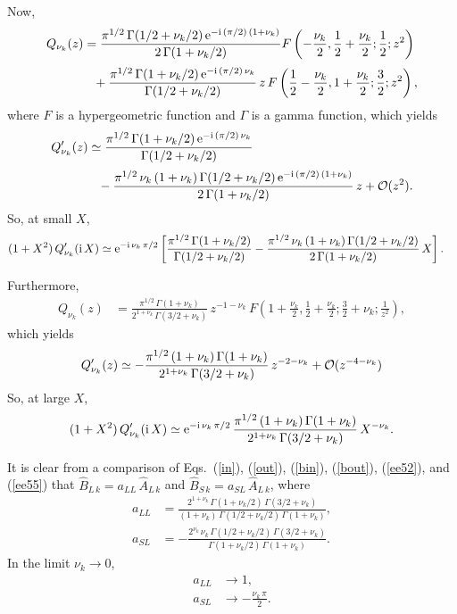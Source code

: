 \documentclass[12pt,prb,aps]{revtex4-1}
\begin{document}
Now,\cite{eda}
\begin{align}
Q_{\nu_k}(z)&= \frac{\pi^{1/2}\,\Gamma(1/2+\nu_k/2)\,{\rm e}^{-{\rm i}\,(\pi/2)\,(1+\nu_k)}}{2\,\Gamma(1+\nu_k/2)}F\left(-\frac{\nu_k}{2},\frac{1}{2}+\frac{\nu_k}{2};\frac{1}{2};z^2\right)\nonumber\\[0.5ex]
&\phantom{=}+\frac{\pi^{1/2}\,\Gamma(1+\nu_k/2)\,{\rm e}^{-{\rm i}\,(\pi/2)\,\nu_k}}{\Gamma(1/2+\nu_k/2)}\,z\,F\left(\frac{1}{2}-\frac{\nu_k}{2},1+\frac{\nu_k}{2};\frac{3}{2};z^2\right),
\end{align}
where $F$ is a hypergeometric function and $\Gamma$ is a gamma function,\cite{abramb,abramd}
which yields
\begin{align}
Q_{\nu_k}'(z)&\simeq\frac{\pi^{1/2}\,\Gamma(1+\nu_k/2)\,{\rm e}^{-{\rm i}\,(\pi/2)\,\nu_k}}{\Gamma(1/2+\nu_k/2)}\nonumber\\[0.5ex]
&\phantom{=}- \frac{\pi^{1/2}\,\nu_k\,(1+\nu_k)\,\Gamma(1/2+\nu_k/2)\,{\rm e}^{-{\rm i}\,(\pi/2)\,(1+\nu_k)}}{2\,\Gamma(1+\nu_k/2)}\,z +{\cal O}(z^2).
\end{align}
So, at small $X$, 
\begin{align}\label{ee52}
(1+X^2)\,Q_{\nu_k}'({\rm i}\,X)&\simeq {\rm e}^{-{\rm i}\,\nu_k\,\pi/2}\left[\frac{\pi^{1/2}\,\Gamma(1+\nu_k/2)}{\Gamma(1/2+\nu_k/2)}
-\frac{\pi^{1/2}\,\nu_k\,(1+\nu_k)\,\Gamma(1/2+\nu_k/2)}{2\,\Gamma(1+\nu_k/2)}\,X\right]. 
\end{align}

Furthermore,\cite{eda}
\begin{align}
Q_{\nu_k}(z) &= \frac{\pi^{1/2}\,{\Gamma}(1+\nu_k)}{2^{1+\nu_k}\,\Gamma(3/2+\nu_k)}\,z^{-1-\nu_k}\,F\left(1+\frac{\nu_k}{2},\frac{1}{2}+\frac{\nu_k}{2};\frac{3}{2}+\nu_k;\frac{1}{z^2}\right),
\end{align}
which yields
\begin{align}
Q_{\nu_k}'(z)\simeq -\frac{\pi^{1/2}\,(1+\nu_k)\,{\Gamma}(1+\nu_k)}{2^{1+\nu_k}\,\Gamma(3/2+\nu_k)}\,z^{-2-\nu_k} + {\cal O}(z^{-4-\nu_k})
\end{align}
So, at large $X$, 
\begin{align}\label{ee55}
(1+X^2)\,Q_{\nu_k}'({\rm i}\,X) \simeq {\rm e}^{-{\rm i}\,\nu_k\,\pi/2}\,\frac{\pi^{1/2}\,(1+\nu_k)\,\Gamma(1+\nu_k)}{2^{1+\nu_k}\,\Gamma(3/2+\nu_k)}\,X^{-\nu_k}.
\end{align}

It is clear from a comparison of Eqs.~(\ref{in}), (\ref{out}), (\ref{bin}), (\ref{bout}), (\ref{ee52}), and (\ref{ee55}) that
$\hat{B}_{L\,k} = a_{LL}\,\hat{A}_{L\,k}$ and 
$\hat{B}_{S\,k}= a_{SL}\,\hat{A}_{L\,k}$,
where
\begin{align}
a_{LL} &= \frac{2^{1+\nu_k}\,\Gamma(1+\nu_k/2)\,\Gamma(3/2+\nu_k)}{(1+\nu_k)\,\Gamma(1/2+\nu_k/2)\,\Gamma(1+\nu_k)},\\[0.5ex]
a_{SL}&=- \frac{2^{\nu_k}\,\nu_k\,\Gamma(1/2+\nu_k/2)\,\Gamma(3/2+\nu_k)}{\Gamma(1+\nu_k/2)\,\Gamma(1+\nu_k)}.
\end{align}
In the limit $\nu_k\rightarrow 0$,
\begin{align}\label{ee32}
a_{LL}&\rightarrow 1,\\[0.5ex]
a_{SL} &\rightarrow - \frac{\nu_k\,\pi}{2}.\label{ee33}
\end{align}
\end{document}
